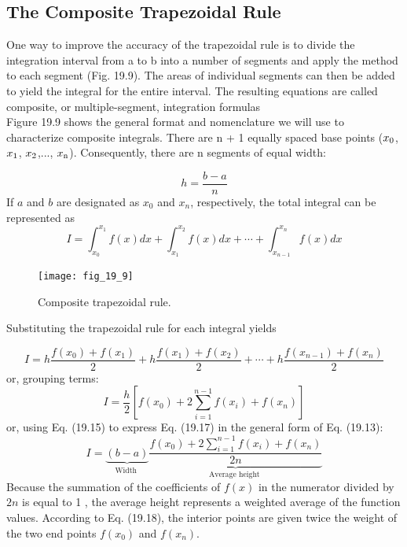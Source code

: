 \documentclass[../main.tex]{subfiles}
\begin{document}
\subsection{The Composite Trapezoidal Rule}

One way to improve the accuracy of the trapezoidal rule is to divide the integration interval
from a to b into a number of segments and apply the method to each segment (Fig. 19.9).
The areas of individual segments can then be added to yield the integral for the entire
interval. The resulting equations are called composite, or multiple-segment, integration
formulas\\
Figure 19.9 shows the general format and nomenclature we will use to characterize
composite integrals. There are n + 1 equally spaced base points ($x\textsubscript{0}$, $x\textsubscript{1}$, $x\textsubscript{2}$,..., $x\textsubscript{n}$). Consequently, there are n segments of equal width:

\begin{equation}
    \tag{19.15}
h=\frac{b-a}{n}
\end{equation}
If $a$ and $b$ are designated as $x_{0}$ and $x_{n}$, respectively, the total integral can be represented as
\begin{equation}
I=\int_{x_{0}}^{x_{1}} f(x) d x+\int_{x_{1}}^{x_{2}} f(x) d x+\cdots+\int_{x_{n-1}}^{x_{n}} f(x) d x
\nonumber\end{equation}

\begin{figure}[H]
    \centering
    \texttt{[image: fig\_19\_9]}
   \caption{\textsf{Composite trapezoidal rule.}}\label{fig:fig_19_9}
\end{figure}

Substituting the trapezoidal rule for each integral yields

\begin{equation}
    \tag{19.16}
I=h \frac{f\left(x_{0}\right)+f\left(x_{1}\right)}{2}+h \frac{f\left(x_{1}\right)+f\left(x_{2}\right)}{2}+\cdots+h \frac{f\left(x_{n-1}\right)+f\left(x_{n}\right)}{2}
\end{equation}
or, grouping terms:
\begin{equation}
    \tag{19.17}
I=\frac{h}{2}\left[f\left(x_{0}\right)+2 \sum_{i=1}^{n-1} f\left(x_{i}\right)+f\left(x_{n}\right)\right]
\end{equation}
or, using Eq. (19.15) to express Eq. (19.17) in the general form of Eq. (19.13):
\begin{equation}
    \tag{19.18}
I=\underbrace{(b-a)}_{\text {Width }} \underbrace{\frac{f\left(x_{0}\right)+2 \sum_{i=1}^{n-1} f\left(x_{i}\right)+f\left(x_{n}\right)}{2 n}}_{\text {Average height }}
\end{equation}
Because the summation of the coefficients of $f(x)$ in the numerator divided by $2 n$ is equal to 1 , the average height represents a weighted average of the function values. According to Eq. (19.18), the interior points are given twice the weight of the two end points $f\left(x_{0}\right)$ and $f\left(x_{n}\right)$.
\end{document}
